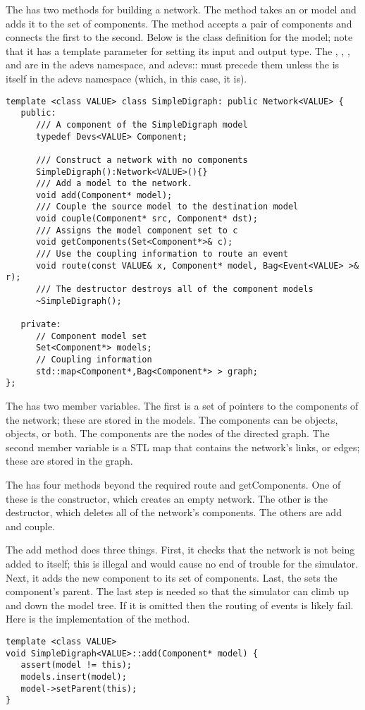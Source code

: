 The  has two methods for building a network. The  method takes an  or  model and adds it to the set of components. The  method accepts a pair of components and connects the first to the second. Below is the class definition for the model; note that it has a template parameter for setting its input and output type. The , , , and  are in the adevs namespace, and \mbox{adevs::} must precede them unless the  is itself in the adevs namespace (which, in this case, it is). 
\begin{verbatim}
template <class VALUE> class SimpleDigraph: public Network<VALUE> { 
   public:
      /// A component of the SimpleDigraph model
      typedef Devs<VALUE> Component;

      /// Construct a network with no components
      SimpleDigraph():Network<VALUE>(){}
      /// Add a model to the network.
      void add(Component* model);
      /// Couple the source model to the destination model  
      void couple(Component* src, Component* dst);
      /// Assigns the model component set to c
      void getComponents(Set<Component*>& c);
      /// Use the coupling information to route an event
      void route(const VALUE& x, Component* model, Bag<Event<VALUE> >& r);
      /// The destructor destroys all of the component models
      ~SimpleDigraph();

   private:   
      // Component model set
      Set<Component*> models;
      // Coupling information
      std::map<Component*,Bag<Component*> > graph;
};
\end{verbatim}
The  has two member variables. The first is a set of pointers to the components of the network; these are stored in the  models. The components can be  objects,  objects, or both. The  components are the nodes of the directed graph. The second member variable is a STL map that contains the network's links, or edges; these are stored in the  graph.

The  has four methods beyond the required route and getComponents. One of these is the constructor, which creates an empty network. The other is the destructor, which deletes all of the network's components. The others are add and couple.

The add method does three things. First, it checks that the network is not being added to itself; this is illegal and would cause no end of trouble for the simulator. Next, it adds the new component to its set of components. Last, the  sets the component's parent. The last step is needed so that the simulator can climb up and down the model tree. If it is omitted then the routing of events is likely fail. Here is the implementation of the  method.
\begin{verbatim}
template <class VALUE> 
void SimpleDigraph<VALUE>::add(Component* model) {
   assert(model != this);
   models.insert(model);
   model->setParent(this);
}
\end{verbatim}

